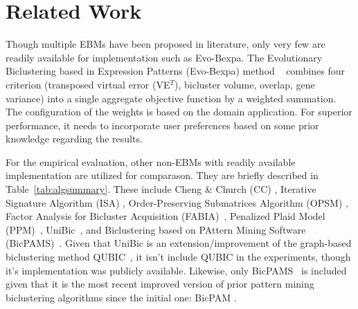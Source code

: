 \section{Related Work}
\label{sec:related}

Though multiple EBMs have been proposed in literature, only very few are readily available for implementation such as Evo-Bexpa. 
The Evolutionary Biclustering based in Expression Patterns (Evo-Bexpa) method ~\cite{pontes2013configurable} combines four criterion (transposed virtual error (VE$^T$), bicluster volume, overlap, gene variance) into a single aggregate objective function by a weighted summation. The configuration of the weights is based on the domain application. For superior performance, it needs to incorporate user preferences based on some prior knowledge regarding the results.

For the empirical evaluation, other non-EBMs with readily available implementation are utilized for comparason. They are briefly described in Table~\ref{tab:algsummary}. 
These include Cheng \& Church (CC) \cite{cheng2000biclustering}, Iterative Signature Algorithm (ISA) \cite{bergmann2003iterative}, Order-Preserving Submatrices Algorithm (OPSM) \cite{ben2003discovering}, Factor Analysis for Bicluster Acquisition (FABIA)~\cite{hochreiter2010fabia}, Penalized Plaid Model (PPM)~\cite{chekouo2015thepenalized}, UniBic~\cite{wang2016unibic}, and Biclustering based on PAttern Mining Software (BicPAMS)~\cite{henriques2017bicpams}.
Given that UniBic is an extension/improvement of the graph-based biclustering method QUBIC~\cite{li2009qubic}, it isn't include QUBIC in the experiments, though it's implementation was publicly available. Likewise, only BicPAMS~\cite{henriques2017bicpams} is included given that it is the most recent improved version of prior pattern mining biclustering algorithms since the initial one: BicPAM \cite{henriques2014bicpam}.

 

